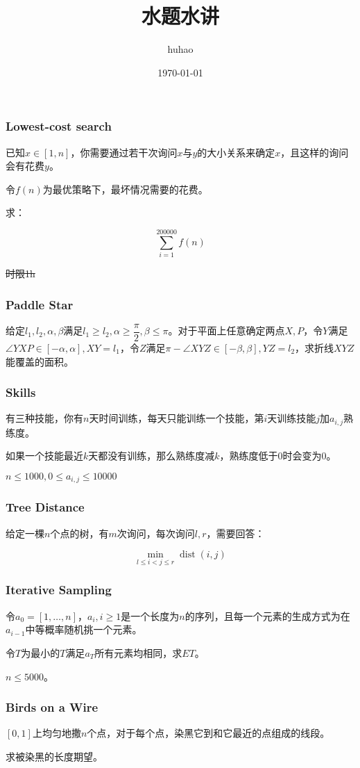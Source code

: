 \documentclass[10pt]{beamer}
\begin{document}
	\title{水题水讲}
	\date{\today}
	\author{huhao}
	\maketitle
	\clearpage
	\begin{frame}
		\frametitle{Lowest-cost search}

		已知$x\in [1,n]$，你需要通过若干次询问$x$与$y$的大小关系来确定$x$，且这样的询问会有花费$y$。

		令$f(n)$为最优策略下，最坏情况需要的花费。

		求：

		$$
		\sum_{i=1}^{200000} f(n)
		$$

		\sout{时限1h}
	\end{frame}
	\begin{frame}
		\frametitle{Paddle Star}
	
		给定$l_1,l_2,\alpha,\beta$满足$l_1\ge l_2,\alpha\ge \dfrac \pi2,\beta\le \pi$。对于平面上任意确定两点$X,P$，令$Y$满足$\angle YXP\in[-\alpha,\alpha],XY=l_1$，令$Z$满足$\pi-\angle XYZ\in[-\beta,\beta],YZ=l_2$，求折线$XYZ$能覆盖的面积。
	
	\end{frame}
	\begin{frame}
		\frametitle{Skills}

		有三种技能，你有$n$天时间训练，每天只能训练一个技能，第$i$天训练技能$j$加$a_{i,j}$熟练度。

		如果一个技能最近$k$天都没有训练，那么熟练度减$k$，熟练度低于0时会变为0。

		$n\le 1000,0\le a_{i,j}\le 10000$
	
	\end{frame}
	\begin{frame}
		\frametitle{Tree Distance}

		给定一棵$n$个点的树，有$m$次询问，每次询问$l,r$，需要回答：

		$$
		\min_{l\le i<j\le r} \operatorname{dist}(i,j)
		$$
	
	\end{frame}
	\begin{frame}
		\frametitle{Iterative Sampling}
	
		令$a_0=[1,\dots,n]$，$a_{i},i\ge 1$是一个长度为$n$的序列，且每一个元素的生成方式为在$a_{i-1}$中等概率随机挑一个元素。

		令$T$为最小的$T$满足$a_T$所有元素均相同，求$ET$。

		$n\le 5000$。
	
	\end{frame}
	\begin{frame}
		\frametitle{Birds on a Wire}
	
		$[0,1]$上均匀地撒$n$个点，对于每个点，染黑它到和它最近的点组成的线段。

		求被染黑的长度期望。
	
	\end{frame}
\end{document}
